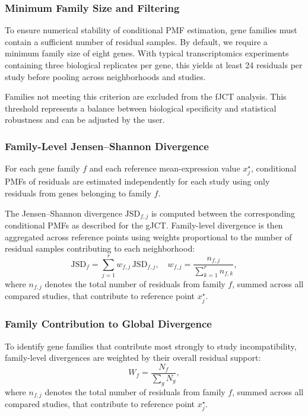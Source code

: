 \subsubsection{Minimum Family Size and Filtering}

To ensure numerical stability of conditional PMF estimation, gene families must contain a sufficient number of residual samples. By default, we require a minimum family size of eight genes. With typical transcriptomics experiments containing three biological replicates per gene, this yields at least 24 residuals per study before pooling across neighborhoods and studies.

Families not meeting this criterion are excluded from the fJCT analysis. This threshold represents a balance between biological specificity and statistical robustness and can be adjusted by the user.

\subsubsection{Family-Level Jensen--Shannon Divergence}

For each gene family $f$ and each reference mean-expression value $x^\star_j$, conditional PMFs of residuals are estimated independently for each study using only residuals from genes belonging to family $f$.

The Jensen--Shannon divergence $\mathrm{JSD}_{f,j}$ is computed between the corresponding conditional PMFs as described for the gJCT. Family-level divergence is then aggregated across reference points using weights proportional to the number of residual samples contributing to each neighborhood:
\[
\mathrm{JSD}_f = \sum_{j=1}^{r} w_{f,j} \, \mathrm{JSD}_{f,j},
\quad
w_{f,j} = \frac{n_{f,j}}{\sum_{k=1}^{r} n_{f,k}},
\]
where $n_{f,j}$ denotes the total number of residuals from family $f$, summed across all compared studies, that contribute to reference point $x^\star_j$.

\subsubsection{Family Contribution to Global Divergence}

To identify gene families that contribute most strongly to study incompatibility, family-level divergences are weighted by their overall residual support:
\[
W_f = \frac{N_f}{\sum_{g} N_g},
\]
where $n_{f,j}$ denotes the total number of residuals from family $f$, summed across all compared studies, that contribute to reference point $x^\star_j$.


